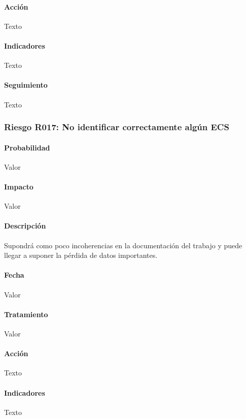 \documentclass[10pt,a4paper]{article}
\begin{document}
				\paragraph{Acción} Texto %
				\paragraph{Indicadores} Texto %
				\paragraph{Seguimiento}	Texto %
				\subsubsection{Riesgo R017: No identificar correctamente algún ECS }
				\paragraph{Probabilidad} Valor
				\paragraph{Impacto}	Valor
				\paragraph{Descripción} Supondrá como poco incoherencias en la documentación del trabajo y puede llegar a suponer la pérdida de datos importantes.
				\paragraph{Fecha} Valor %
				\paragraph{Tratamiento} Valor %
				\paragraph{Acción} Texto %
				\paragraph{Indicadores} Texto %
\end{document}
